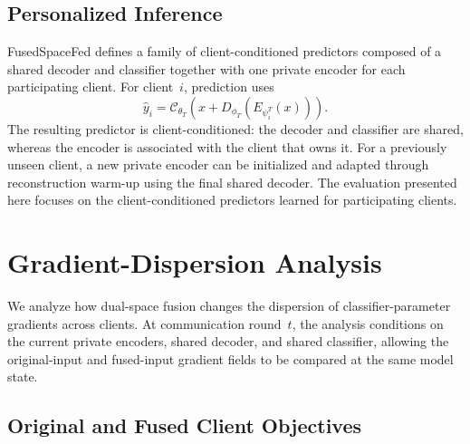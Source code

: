 \documentclass[twoside]{article}
\theoremstyle{thmstyleone}%
\theoremstyle{thmstyletwo}%
\theoremstyle{thmstylethree}%
\begin{document}

\subsection{Personalized Inference}\label{sec:inference}

FusedSpaceFed defines a family of client-conditioned predictors composed of a
shared decoder and classifier together with one private encoder for each
participating client. For client~$i$, prediction uses
\begin{equation*}
\hat{y}_i
=
\mathcal{C}_{\theta_T}
\left(
x+D_{\phi_T}\!\left(E_{\psi_i^T}(x)\right)
\right).
\end{equation*}
The resulting predictor is client-conditioned: the decoder and classifier are
shared, whereas the encoder is associated with the client that owns it.
For a previously unseen client, a new private encoder can be initialized and
adapted through reconstruction warm-up using the final shared decoder. The
evaluation presented here focuses on the client-conditioned predictors learned
for participating clients.




\section{Gradient-Dispersion Analysis}
\label{sec:theory}

We analyze how dual-space fusion changes the dispersion of
classifier-parameter gradients across clients. At communication round~$t$, the
analysis conditions on the current private encoders, shared decoder, and shared
classifier, allowing the original-input and fused-input gradient fields to be
compared at the same model state.

\subsection{Original and Fused Client Objectives}
\end{document}
